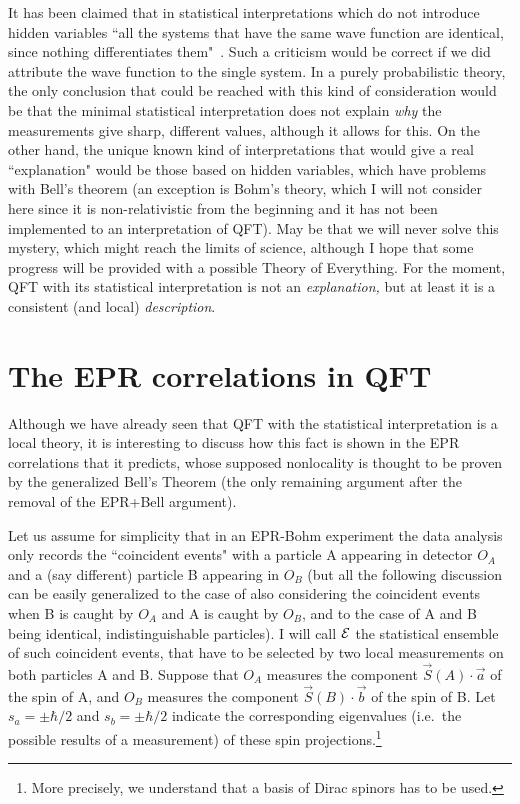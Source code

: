 \documentclass[12pt]{article}
\begin{document}
It has been claimed that in statistical interpretations which do
not introduce hidden variables ``all the systems that have the
same wave function are identical, since nothing differentiates
them"~\cite{dEspagnat}. Such a criticism would be correct if we
did attribute the wave function to the single system. In a purely
probabilistic theory, the only conclusion that could be reached
with this kind of consideration would be that the minimal
statistical interpretation does not explain \emph{why} the
measurements give sharp, different values, although it allows for
this. On the other hand, the unique known kind of interpretations
that would give a real ``explanation" would be those based on
hidden variables, which have problems with Bell's theorem (an
exception is Bohm's theory, which I will not consider here since
it is non-relativistic from the beginning and it has not been
implemented to an interpretation of QFT). May be that we will
never solve this mystery, which might reach the limits of science,
although I hope that some progress will be provided with a
possible Theory of Everything. For the moment, QFT with its
statistical interpretation is not an \emph{explanation,} but at
least it is a consistent (and local) \emph{description}.


\section{The EPR correlations in QFT}

Although we have already seen that QFT with the statistical
interpretation is a local theory, it is interesting to discuss how
this fact is shown in the EPR correlations that it predicts, whose
supposed nonlocality is thought to be proven by the generalized
Bell's Theorem (the only remaining argument after the removal of
the EPR+Bell argument).

Let us assume for simplicity that in an EPR-Bohm experiment the data
analysis only records the ``coincident events" with a particle A
appearing in detector $O_A$ and a (say different) particle B appearing
in $O_B$ (but all the following discussion can be easily generalized
to the case of also considering the coincident events when B is caught
by $O_A$ and A is caught by $O_B$, and to the case of A and B being
identical, indistinguishable particles). I will call ${\cal E}$ the
statistical ensemble of such coincident events, that have to be
selected by two local measurements on both particles A and B.  Suppose
that $O_A$ measures the component $\vec S(A)\cdot\vec a$ of the spin
of A, and $O_B$ measures the component $\vec S(B)\cdot\vec b$ of the
spin of B. Let $s_a=\pm\hbar/2$ and $s_b=\pm\hbar/2$ indicate the
corresponding eigenvalues (i.e.\ the possible results of a
measurement) of these spin projections.\footnote{More precisely, we
understand that a basis of Dirac spinors has to be used.}
\end{document}
